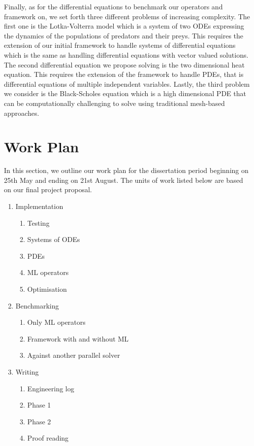 \documentclass{article}
\begin{document}
Finally, as for the differential equations to benchmark our operators and framework on, we set forth three different problems of increasing complexity. The first one is the Lotka-Volterra model \cite{lotka1926} \cite{volterra1927} which is a system of two ODEs expressing the dynamics of the populations of predators and their preys. This requires the extension of our initial framework to handle systems of differential equations which is the same as handling differential equations with vector valued solutions. The second differential equation we propose solving is the two dimensional heat equation. This requires the extension of the framework to handle PDEs, that is differential equations of multiple independent variables. Lastly, the third problem we consider is the Black-Scholes equation \cite{black1973} which is a high dimensional PDE that can be computationally challenging to solve using traditional mesh-based approaches.

\section{Work Plan}

In this section, we outline our work plan for the dissertation period beginning on 25th May and ending on 21st August. The units of work listed below are based on our final project proposal.

\begin{enumerate}
    \item Implementation
        \begin{enumerate}
        	\item Testing
        	\item Systems of ODEs
        	\item PDEs
        	\item ML operators
        	\item Optimisation
        \end{enumerate}
    \item Benchmarking
        \begin{enumerate}
        	\item Only ML operators
        	\item Framework with and without ML
        	\item Against another parallel solver
        \end{enumerate}
    \item Writing
        \begin{enumerate}
            \item Engineering log
            \item Phase 1
            \item Phase 2
        	\item Proof reading
        \end{enumerate}
\end{enumerate}
\end{document}
